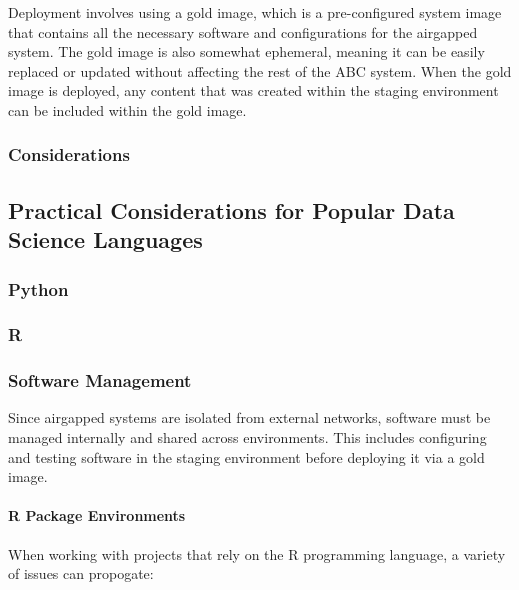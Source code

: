 \documentclass{amia}
\begin{document}
Deployment involves using a gold image, which is a pre-configured system image that contains all the necessary software and configurations for the airgapped system. The gold image is also somewhat ephemeral, meaning it can be easily replaced or updated without affecting the rest of the ABC system. When the gold image is deployed, any content that was created within the staging environment can be included within the gold image. 

\subsubsection{Considerations}

\subsection*{Practical Considerations for Popular Data Science Languages}

\subsubsection*{Python}

\subsubsection*{R}

\subsubsection*{Software Management}

Since airgapped systems are isolated from external networks, software must be managed internally and shared across environments. This includes configuring and testing software in the staging environment before deploying it via a gold image. 

\paragraph{R Package Environments}

When working with projects that rely on the R programming language, a variety of issues can propogate:
\end{document}
